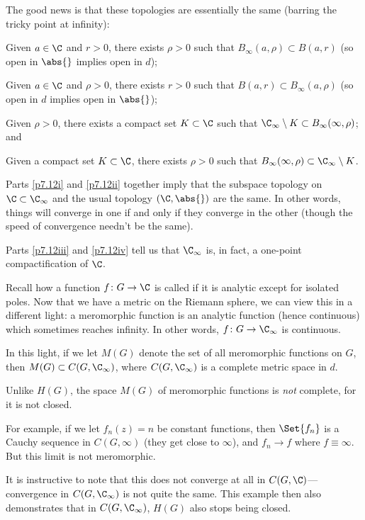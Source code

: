 The good news is that these topologies are essentially the same (barring the tricky point at infinity):

\begin{proposition}\label{prop7.12}
	\begin{items}
		\item\label{p7.12i} Given $a \in \C$ and $r > 0$, there exists $\rho > 0$ such that $B_\infty(a, \rho) \subset B(a, r)$ (so open in $\abs{}$ implies open in $d$);
		\item\label{p7.12ii} Given $a \in \C$ and $\rho > 0$, there exists $r > 0$ such that $B(a, r) \subset B_\infty(a, \rho)$ (so open in $d$ implies open in $\abs{}$);
		\item\label{p7.12iii} Given $\rho > 0$, there exists a compact set $K \subset \C$ such that $\C_\infty \setminus K \subset B_\infty(\infty, \rho)$; and
		\item\label{p7.12iv} Given a compact set $K \subset \C$, there exists $\rho > 0$ such that $B_\infty(\infty, \rho) \subset \C_\infty \setminus K$.
	\end{items}
\end{proposition}

\begin{remark}
	Parts \ref{p7.12i} and \ref{p7.12ii} together imply that the subspace topology on $\C \subset \C_\infty$ and the usual topology $(\C, \abs{})$ are the same.
	In other words, things will converge in one if and only if they converge in the other (though the speed of convergence needn't be the same).

	Parts \ref{p7.12iii} and \ref{p7.12iv} tell us that $\C_\infty$ is, in fact, a one-point compactification of $\C$.
\end{remark}

Recall how a function $f \colon G \to \C$ is called  if it is analytic except for isolated poles.
Now that we have a metric on the Riemann sphere, we can view this in a different light: a meromorphic function is an analytic function (hence continuous) which sometimes reaches infinity.
In other words, $f \colon G \to \C_\infty$ is continuous.

In this light, if we let $M(G)$ denote the set of all meromorphic functions on $G$, then $M(G) \subset C(G, \C_\infty)$, where $C(G, \C_\infty)$ is a complete metric space in $d$.

\begin{remark}
	Unlike $H(G)$, the space $M(G)$ of meromorphic functions is \emph{not} complete, for it is not closed.

	For example, if we let $f_n(z) = n$ be constant functions, then $\Set{f_n}$ is a Cauchy sequence in $C(G, \infty)$ (they get close to $\infty$), and $f_n \to f$ where $f \equiv \infty$.
	But this limit is not meromorphic.

	It is instructive to note that this does not converge at all in $C(G, \C)$---convergence in $C(G, \C_\infty)$ is not quite the same.
	This example then also demonstrates that in $C(G, \C_\infty)$, $H(G)$ also stops being closed.
\end{remark}


